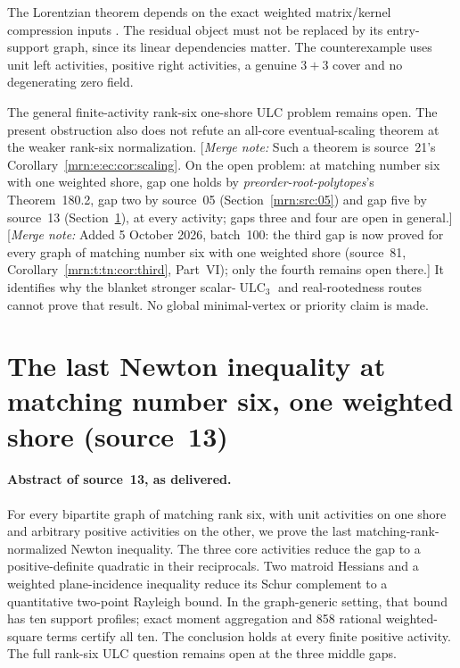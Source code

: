\documentclass[11pt,a4paper]{article}
\theoremstyle{remark}\newtheorem{remark}[theorem]{Remark}
\newcommand{\ULC}{\operatorname{ULC}}      %
\newcommand{\mnote}[1]{[\textit{Merge note:} #1]}
\newcommand{\prp}{\emph{preorder-root-polytopes}}
\begin{document}
The Lorentzian theorem depends on the exact weighted matrix/kernel compression inputs \cite{b:m60}. The residual object must not be replaced by its entry-support graph, since its linear dependencies matter. The counterexample uses unit left activities, positive right activities, a genuine $3+3$ cover and no degenerating zero field.

The general finite-activity rank-six one-shore ULC problem remains open. The present obstruction also does not refute an all-core eventual-scaling theorem at the weaker rank-six normalization. \mnote{Such a theorem is source~21's Corollary~\ref{mrn:e:ec:cor:scaling}. On the open problem: at matching number six with one weighted shore, gap one holds by \prp's Theorem~180.2, gap two by source~05 (Section~\ref{mrn:src:05}) and gap five by source~13 (Section~\ref{mrn:src:13}), at every activity; gaps three and four are open in general.} \mnote{Added 5 October 2026, batch~100: the third gap is now proved for every graph of matching number six with one weighted shore (source~81, Corollary~\ref{mrn:t:tn:cor:third}, Part~VI); only the fourth remains open there.} It identifies why the blanket stronger scalar-$\ULC_3$ and real-rootedness routes cannot prove that result. No global minimal-vertex or priority claim is made.

\section{The last Newton inequality at matching number six, one weighted shore (source~13)}\label{mrn:src:13}
\paragraph{Abstract of source~13, as delivered.} For every bipartite graph of matching rank six, with unit activities on one shore and arbitrary positive activities on the other, we prove the last matching-rank-normalized Newton inequality. The three core activities reduce the gap to a positive-definite quadratic in their reciprocals. Two matroid Hessians and a weighted plane-incidence inequality reduce its Schur complement to a quantitative two-point Rayleigh bound. In the graph-generic setting, that bound has ten support profiles; exact moment aggregation and 858 rational weighted-square terms certify all ten. The conclusion holds at every finite positive activity. The full rank-six ULC question remains open at the three middle gaps.
\end{document}
